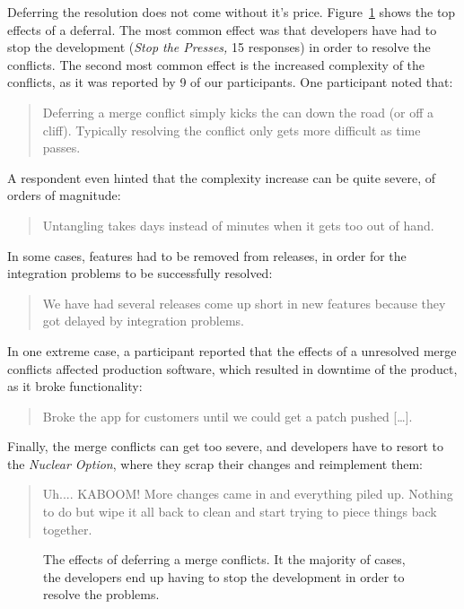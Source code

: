 
Deferring the resolution does not come without it's price.
Figure~\ref{fig:effects-deferral} shows the top effects of a deferral.
The most common effect was that developers have had to stop the development (\emph{Stop the Presses,} 15 responses) in order to resolve the conflicts.
The second most common effect is the increased complexity of the conflicts, as it was reported by 9 of our participants.
One participant noted that:
\begin{quotation}
	Deferring a merge conflict simply kicks the can down the road (or off a cliff). Typically resolving the conflict only gets more difficult as time passes.
\end{quotation}
A respondent even hinted that the complexity increase can be quite severe, of orders of magnitude:
\begin{quotation}
	Untangling takes days instead of minutes when it gets too out of hand.
\end{quotation}
In some cases, features had to be removed from releases, in order for the integration problems to be successfully resolved:
\begin{quotation}
	We have had several releases come up short in new features because they got delayed by integration problems.
\end{quotation}

In one extreme case, a participant reported that the effects of a unresolved merge conflicts affected production software, which resulted in downtime of the product, as it broke functionality:
\begin{quotation}
	Broke the app for customers until we could get a patch pushed [\ldots].
\end{quotation}
Finally, the merge conflicts can get too severe, and developers have to resort to the \emph{Nuclear Option}, where they scrap their changes and reimplement them:
\begin{quotation}
	Uh.... KABOOM! More changes came in and everything piled up. Nothing to do but wipe it all back to clean and start trying to piece things back together.
\end{quotation}

\begin{figure}
	\centering
	\caption{The effects of deferring a merge conflicts. It the majority of cases, the developers end up having to stop the development in order to resolve the problems.}
	\label{fig:effects-deferral}
\end{figure}


